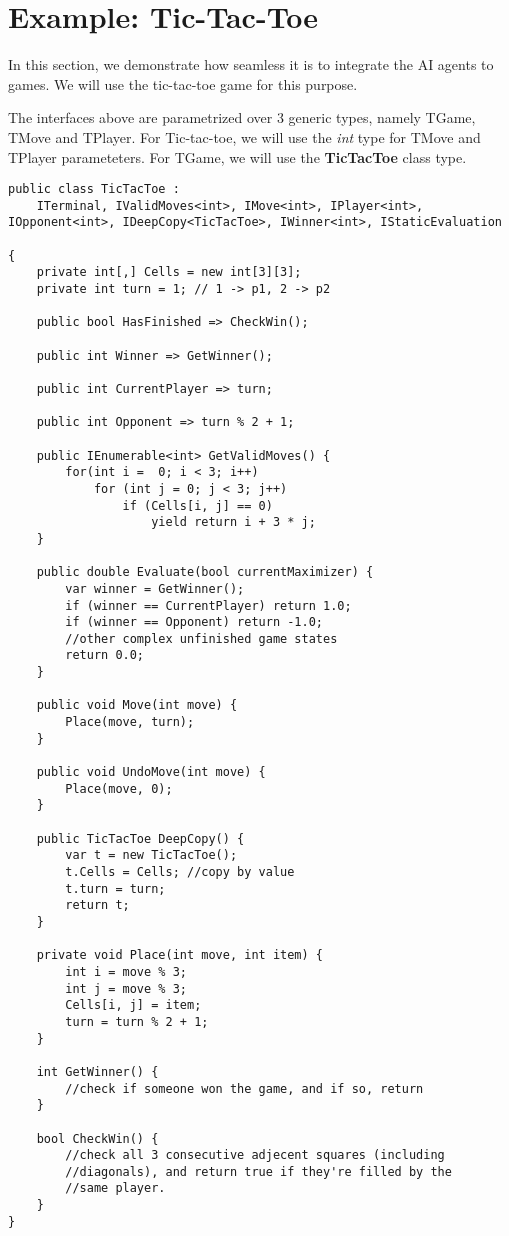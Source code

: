 \section{Example: Tic-Tac-Toe}

In this section, we demonstrate how seamless it is to integrate the \ac{AI} agents to games. We will use the tic-tac-toe game for this purpose.

The interfaces above are parametrized over 3 generic types, namely TGame, TMove and TPlayer. For Tic-tac-toe, we will use the \textit{int} type for TMove and TPlayer parameteters. For TGame, we will use the \textbf{TicTacToe} class type.

\begin{lstlisting}
public class TicTacToe :
    ITerminal, IValidMoves<int>, IMove<int>, IPlayer<int>, IOpponent<int>, IDeepCopy<TicTacToe>, IWinner<int>, IStaticEvaluation
    
{
    private int[,] Cells = new int[3][3];
    private int turn = 1; // 1 -> p1, 2 -> p2
    
    public bool HasFinished => CheckWin();

    public int Winner => GetWinner();

    public int CurrentPlayer => turn;

    public int Opponent => turn % 2 + 1;

    public IEnumerable<int> GetValidMoves() {
        for(int i =  0; i < 3; i++)
            for (int j = 0; j < 3; j++)
                if (Cells[i, j] == 0)
                    yield return i + 3 * j;
    }

    public double Evaluate(bool currentMaximizer) {
        var winner = GetWinner();
        if (winner == CurrentPlayer) return 1.0;
        if (winner == Opponent) return -1.0;
        //other complex unfinished game states
        return 0.0;      
    }

    public void Move(int move) {
        Place(move, turn);
    }

    public void UndoMove(int move) {
        Place(move, 0);
    }

    public TicTacToe DeepCopy() {
        var t = new TicTacToe();
        t.Cells = Cells; //copy by value
        t.turn = turn;
        return t;
    }

    private void Place(int move, int item) {
        int i = move % 3;
        int j = move % 3;
        Cells[i, j] = item;
        turn = turn % 2 + 1;
    }

    int GetWinner() {
        //check if someone won the game, and if so, return
    }

    bool CheckWin() {
        //check all 3 consecutive adjecent squares (including
        //diagonals), and return true if they're filled by the
        //same player.
    }
}
\end{lstlisting}

